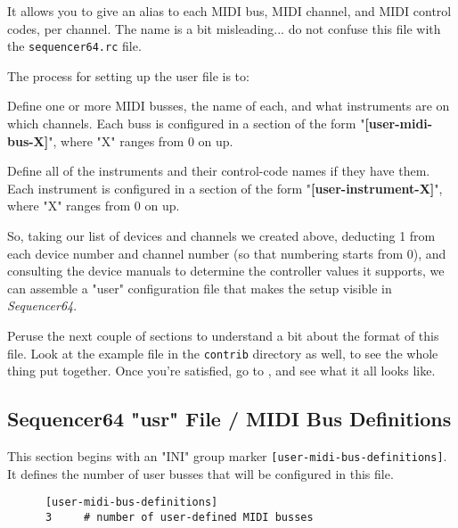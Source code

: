    It allows you to give an alias to 
   each MIDI bus, MIDI channel, and MIDI control 
   codes, per channel.
   The name is a bit misleading... do not confuse this file with the
   \texttt{sequencer64.rc} file.

   The process for setting up the user file is to:

   \begin{enumber}
      \item Define one or more MIDI busses, the name of each, and what
         instruments are on which channels.  Each buss is configured in a
         section of the form "\textbf{[user-midi-bus-X]}", where "X" ranges
         from 0 on up.
      \item Define all of the instruments and their control-code
         names if they have them.  Each instrument is configured in a
         section of the form "\textbf{[user-instrument-X]}", where "X"
         ranges from 0 on up.
   \end{enumber}

   So, taking our list of devices and channels we created above,
   deducting 1 from each device number and channel number (so that numbering
   starts from 0), and consulting the device manuals to determine the
   controller values it supports, we can assemble a "user" configuration file
   that makes the setup visible in \textsl{Sequencer64}.

   Peruse the next couple of sections to understand a bit about the format of
   this file.  Look at the example file in the \texttt{contrib} directory as
   well, to see the whole thing put together.
   Once you're satisfied, go to
   , and 
   see what it all looks like.

\subsection{Sequencer64 "usr" File / MIDI Bus Definitions}
\label{subsec:seq64_usr_file_midi_bus_definitions}

   This section begins with an
   "INI" group marker \texttt{[user-midi-bus-definitions]}.
   It defines the number of user busses that will be configured in this file.

   \begin{verbatim}
      [user-midi-bus-definitions]
      3     # number of user-defined MIDI busses
   \end{verbatim}

